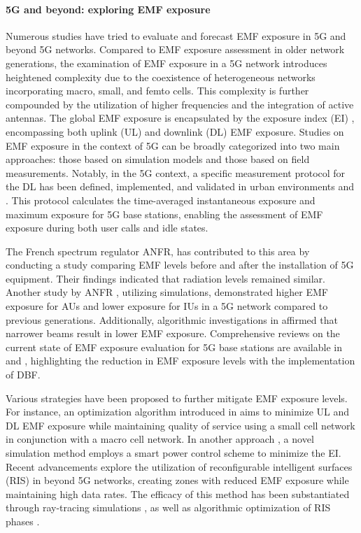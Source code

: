 \paragraph{5G and beyond: exploring EMF exposure}

Numerous studies have tried to evaluate and forecast EMF exposure in 5G and beyond 5G networks. Compared to EMF exposure assessment in older network generations, the examination of EMF exposure in a 5G network introduces heightened complexity due to the coexistence of heterogeneous networks incorporating macro, small, and femto cells. This complexity is further compounded by the utilization of higher frequencies and the integration of active antennas. The global EMF exposure is encapsulated by the exposure index (EI) \cite{EI}, encompassing both uplink (UL) and downlink (DL) EMF exposure. Studies on EMF exposure in the context of 5G can be broadly categorized into two main approaches: those based on simulation models and those based on field measurements. Notably, in the 5G context, a specific measurement protocol for the DL has been defined, implemented, and validated in urban environments \cite{IMEC_nl} and \cite{IMEC_protocol_paper}. This protocol calculates the time-averaged instantaneous exposure and maximum exposure for 5G base stations, enabling the assessment of EMF exposure during both user calls and idle states.

The French spectrum regulator ANFR, has contributed to this area by conducting a study \cite{ANFR2021} comparing EMF levels before and after the installation of 5G equipment. Their findings indicated that radiation levels remained similar. Another study by ANFR \cite{ANFR2019a}, utilizing simulations, demonstrated higher EMF exposure for AUs and lower exposure for IUs in a 5G network compared to previous generations. Additionally, algorithmic investigations in \cite{Chiaraviglio21} affirmed that narrower beams result in lower EMF exposure. Comprehensive reviews on the current state of EMF exposure evaluation for 5G base stations are available in \cite{Elbasheir21} and \cite{patsouras_2023_8099834}, highlighting the reduction in EMF exposure levels with the implementation of DBF.

Various strategies have been proposed to further mitigate EMF exposure levels. For instance, an optimization algorithm introduced in \cite{Sidi15} aims to minimize UL and DL EMF exposure while maintaining quality of service using a small cell network in conjunction with a macro cell network. In another approach \cite{Ajibare21}, a novel simulation method employs a smart power control scheme to minimize the EI. Recent advancements explore the utilization of reconfigurable intelligent surfaces (RIS) in beyond 5G networks, creating zones with reduced EMF exposure while maintaining high data rates. The efficacy of this method has been substantiated through ray-tracing simulations \cite{Strinati21, PhanHuy22}, as well as algorithmic optimization of RIS phases \cite{Ibraiwish22}.


